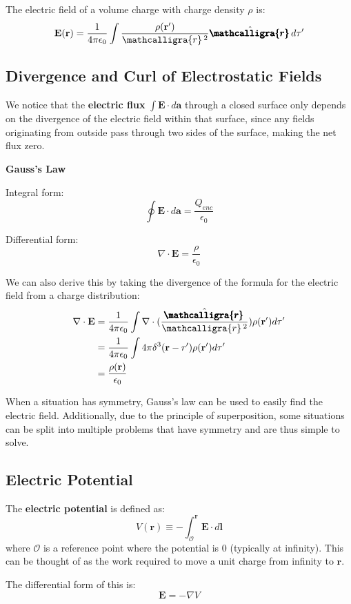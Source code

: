 \documentclass{article}
\newcommand{\scriptr}{\mathcalligra{r}\,}
\newcommand{\boldscriptr}{\pmb{\mathcalligra{r}}\,}
\begin{document}
The electric field of a volume charge with charge density \(\rho \) is:
\[
    \mathbf{E} (\mathbf{r} )=\frac{1}{4 \pi \epsilon_0}\int \frac{\rho (\mathbf{r}^{\prime})}{\scriptr^2}\hat{\boldscriptr} d \tau^{\prime} 
\]

\subsection{Divergence and Curl of Electrostatic Fields}
We notice that the \textbf{electric flux} \(\int \mathbf{E}\cdot d \mathbf{a} \) through a closed surface only depends on the divergence 
of the electric field within that surface, since any fields originating from outside pass through two sides of the surface, making the net flux zero.
\begin{law}{\textbf{Gauss's Law}}
    $ $ \newline
    
    Integral form:
    \[
        \oint \mathbf{E} \cdot d \mathbf{a}=\frac{Q_{enc}}{\epsilon_0}
    \]

    Differential form:
    \[
        \nabla \cdot \mathbf{E}=\frac{\rho }{\epsilon_0}
    \]
\end{law}

We can also derive this by taking the divergence of the formula for the electric field from a charge distribution:
\begin{align*}
    \nabla \cdot \mathbf{E} &=\frac{1}{4 \pi \epsilon_0}\int \nabla \cdot (\frac{\hat{\boldscriptr}}{\scriptr^2})\rho (\mathbf{r}^{\prime} )d \tau^{\prime}  \\
    &= \frac{1}{4 \pi  \epsilon_0}\int 4 \pi \delta^3(\mathbf{r}-r^{\prime})\rho(\mathbf{r}^{\prime} )d \tau^{\prime} \\
    &=\frac{\rho(\mathbf{r})}{\epsilon_0}
\end{align*}

When a situation has symmetry, Gauss's law can be used to easily find the electric field. Additionally, due to the principle of superposition, some 
situations can be split into multiple problems that have symmetry and are thus simple to solve.

\subsection{Electric Potential}
\begin{definition}
    The \textbf{electric potential} is defined as:
    \[
        V(\mathbf{r} )\equiv -\int_{\mathscr{O}}^{\mathbf{r} }\mathbf{E} \cdot d \mathbf{l} 
    \]
    where \(\mathscr{O}\) is a reference point where the potential is 0 (typically at infinity). This can be 
    thought of as the work required to move a unit charge from infinity to \(\mathbf{r}\).
    
    The differential form of this is:
    \[
        \mathbf{E} =-\nabla V
    \]
\end{definition}
\end{document}
